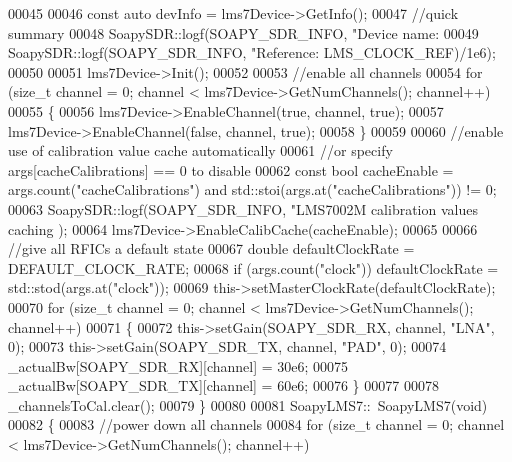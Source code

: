\begin{DoxyCode}
{00045 
00046     \textcolor{keyword}{const} \textcolor{keyword}{auto} devInfo = lms7Device->GetInfo();
00047     \textcolor{comment}{//quick summary}
00048     SoapySDR::logf(SOAPY_SDR_INFO, \textcolor{stringliteral}{"Device name: %
00049     SoapySDR::logf(SOAPY_SDR_INFO, \textcolor{stringliteral}{"Reference: %
      LMS_CLOCK_REF)/1e6);
00050 
00051     lms7Device->Init();
00052 
00053     \textcolor{comment}{//enable all channels}
00054     \textcolor{keywordflow}{for} (\textcolor{keywordtype}{size\_t} channel = 0; channel < lms7Device->GetNumChannels(); channel++)
00055     \{
00056         lms7Device->EnableChannel(\textcolor{keyword}{true}, channel, \textcolor{keyword}{true});
00057         lms7Device->EnableChannel(\textcolor{keyword}{false}, channel, \textcolor{keyword}{true});
00058     \}
00059 
00060     \textcolor{comment}{//enable use of calibration value cache automatically}
00061     \textcolor{comment}{//or specify args[cacheCalibrations] == 0 to disable}
00062     \textcolor{keyword}{const} \textcolor{keywordtype}{bool} cacheEnable = args.count(\textcolor{stringliteral}{"cacheCalibrations"}) and std::stoi(args.at(\textcolor{stringliteral}{"cacheCalibrations"})) !=
       0;
00063     SoapySDR::logf(SOAPY_SDR_INFO, \textcolor{stringliteral}{"LMS7002M calibration values caching %
      );
00064     lms7Device->EnableCalibCache(cacheEnable);
00065 
00066     \textcolor{comment}{//give all RFICs a default state}
00067     \textcolor{keywordtype}{double} defaultClockRate = DEFAULT_CLOCK_RATE;
00068     \textcolor{keywordflow}{if} (args.count(\textcolor{stringliteral}{"clock"})) defaultClockRate = std::stod(args.at(\textcolor{stringliteral}{"clock"}));
00069     this->setMasterClockRate(defaultClockRate);
00070     \textcolor{keywordflow}{for} (\textcolor{keywordtype}{size\_t} channel = 0; channel < lms7Device->GetNumChannels(); channel++)
00071     \{
00072         this->setGain(SOAPY_SDR_RX, channel, \textcolor{stringliteral}{"LNA"}, 0);
00073         this->setGain(SOAPY_SDR_TX, channel, \textcolor{stringliteral}{"PAD"}, 0);
00074         _actualBw[SOAPY_SDR_RX][channel] = 30e6;
00075         _actualBw[SOAPY_SDR_TX][channel] = 60e6;
00076     \}
00077 
00078     _channelsToCal.clear();
00079 \}
00080 
00081 SoapyLMS7::~SoapyLMS7(\textcolor{keywordtype}{void})
00082 \{
00083     \textcolor{comment}{//power down all channels}
00084     \textcolor{keywordflow}{for} (\textcolor{keywordtype}{size\_t} channel = 0; channel < lms7Device->GetNumChannels(); channel++)
}}}}
\end{DoxyCode}
